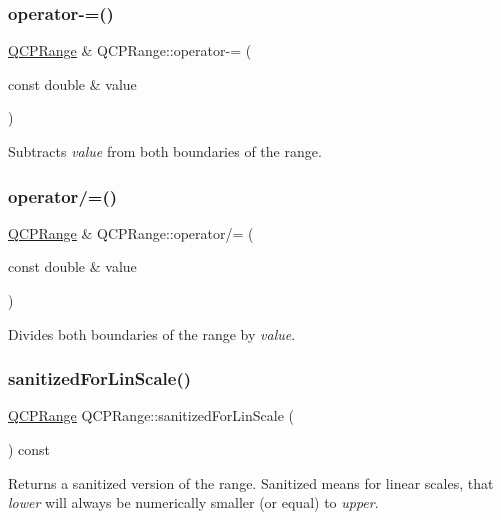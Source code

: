 \subsubsection{\texorpdfstring{operator-\/=()}{operator-=()}}
{\footnotesize\ttfamily \hyperlink{class_q_c_p_range}{Q\+C\+P\+Range} \& Q\+C\+P\+Range\+::operator-\/= (\begin{DoxyParamCaption}\item[{const double \&}]{value }\end{DoxyParamCaption})\hspace{0.3cm}{\ttfamily [inline]}}

Subtracts {\itshape value} from both boundaries of the range. \mbox{\label{class_q_c_p_range_a6137d8682b6835ace840730b4c1e2d63}} 
\subsubsection{\texorpdfstring{operator/=()}{operator/=()}}
{\footnotesize\ttfamily \hyperlink{class_q_c_p_range}{Q\+C\+P\+Range} \& Q\+C\+P\+Range\+::operator/= (\begin{DoxyParamCaption}\item[{const double \&}]{value }\end{DoxyParamCaption})\hspace{0.3cm}{\ttfamily [inline]}}

Divides both boundaries of the range by {\itshape value}. \mbox{\label{class_q_c_p_range_a808751fdd9b17ef52327ba011df2e5f1}} 
\subsubsection{\texorpdfstring{sanitized\+For\+Lin\+Scale()}{sanitizedForLinScale()}}
{\footnotesize\ttfamily \hyperlink{class_q_c_p_range}{Q\+C\+P\+Range} Q\+C\+P\+Range\+::sanitized\+For\+Lin\+Scale (\begin{DoxyParamCaption}{ }\end{DoxyParamCaption}) const}

Returns a sanitized version of the range. Sanitized means for linear scales, that {\itshape lower} will always be numerically smaller (or equal) to {\itshape upper}. \mbox{\label{class_q_c_p_range_a3d66288d66e1d6df3636075eb42502ee}} 
